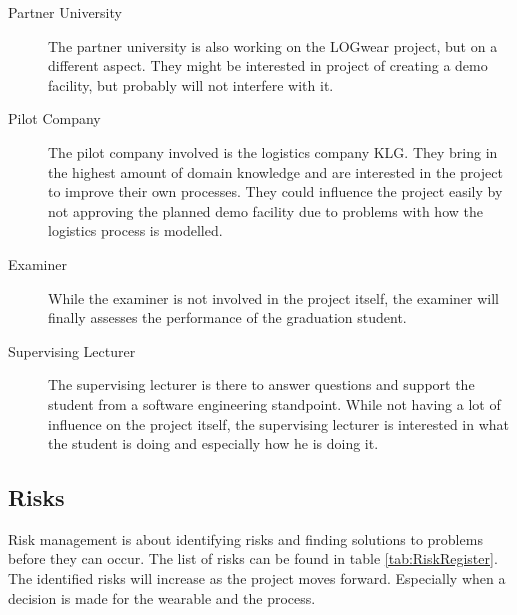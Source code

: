\begin{description}
	\item[Partner University] \hfill
	
	The partner university is also working on the LOGwear project, but on a different aspect. They might be interested in project of creating a demo facility, but probably will not interfere with it.\\
	
	\item[Pilot Company] \hfill
	
	The pilot company involved is the logistics company KLG. They bring in the highest amount of domain knowledge and are interested in the project to improve their own processes. They could influence the project easily by not approving the planned demo facility due to problems with how the logistics process is modelled.
	\item[Examiner] \hfill
	
	While the examiner is not involved in the project itself, the examiner will finally assesses the performance of the graduation student.
	\item[Supervising Lecturer] \hfill
	
	The supervising lecturer is there to answer questions and support the student from a software engineering standpoint. While not having a lot of influence on the project itself, the supervising lecturer is interested in what the student is doing and especially how he is doing it.
\end{description}
\newpage
\subsection{Risks}
Risk management is about identifying risks and finding solutions to problems before they can occur. The list of risks can be found in table \ref{tab:RiskRegister}. The identified risks will increase as the project moves forward. Especially when a decision is made for the wearable and the process. 

